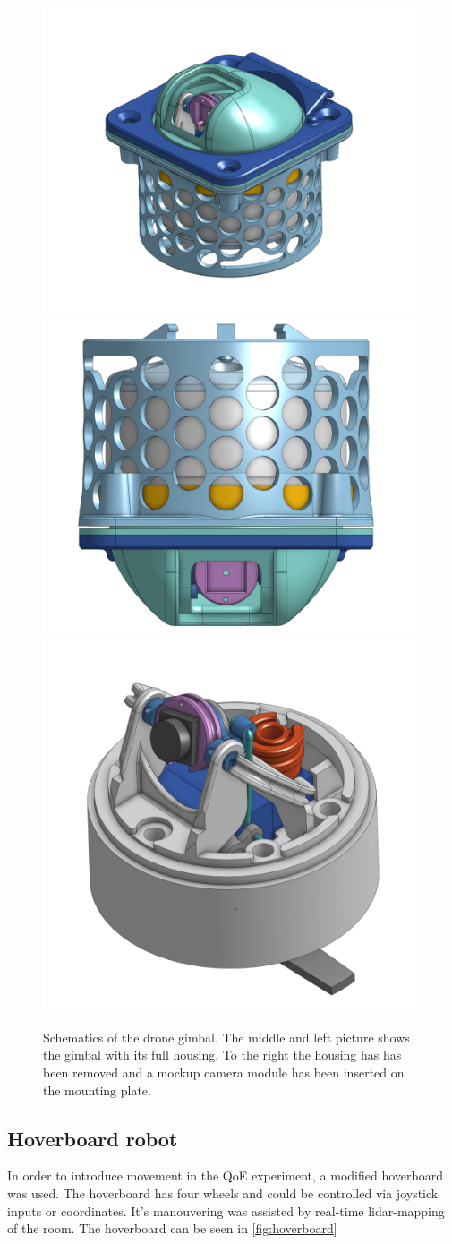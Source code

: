 \documentclass[nofilelist]{cslthse-msc}
\begin{document}
\begin{description}
   \begin{figure}[htp]
      \centering
      \includegraphics[width=.3\textwidth]{images/gimbal-1.png}\hfill
      \includegraphics[width=.3\textwidth]{images/gimbal-2.png}\hfill
      \includegraphics[width=.3\textwidth]{images/gimbal-3.png}
      \caption{Schematics of the drone gimbal. The middle and left picture shows the gimbal with its full housing. To the right the housing has has been removed and a mockup camera module has been inserted on the mounting plate.}
      \label{fig:gimbal-pics}
   \end{figure}
\end{description}
   
\subsection{Hoverboard robot}
In order to introduce movement in the QoE experiment, a modified hoverboard was used. The hoverboard has four wheels and could be controlled via joystick inputs or coordinates. It's manouvering was assisted by real-time lidar-mapping of the room. The hoverboard can be seen in \ref{fig:hoverboard}
\end{document}
